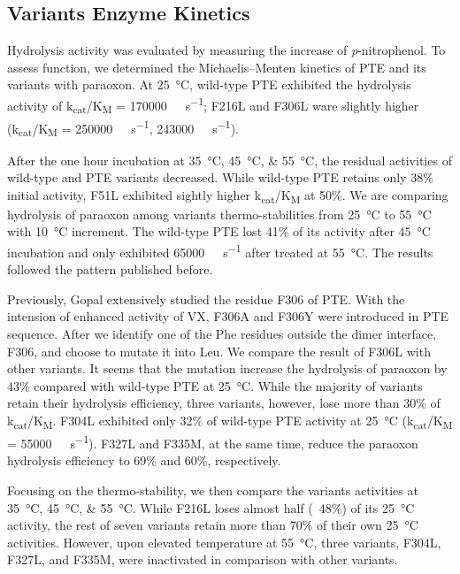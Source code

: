 \begin{refsection}
\subsection{Variants Enzyme Kinetics}

Hydrolysis activity was evaluated by measuring the increase of
\emph{p}-nitrophenol. To assess function, we determined the Michaelis–Menten
kinetics of PTE and its variants with paraoxon. At \SI{25}{\celsius},
wild-type PTE exhibited the hydrolysis activity of
k\textsubscript{cat}/K\textsubscript{M} = \SI{170000}{\per\Molar\per\second};
F216L and F306L ware slightly higher (k\textsubscript{cat}/K\textsubscript{M} =
\SI{250000}{\per\Molar\per\second}, \SI{243000}{\per\Molar\per\second}). 

After the one hour incubation at \SIlist{35;45;55}{\celsius}, the residual
activities of wild-type and PTE variants decreased. While wild-type PTE retains
only 38\% initial activity, F51L exhibited sightly higher
k\textsubscript{cat}/K\textsubscript{M} at 50\%. We are comparing hydrolysis of
paraoxon among variants thermo-stabilities from \SI{25}{\celsius} to
\SI{55}{\celsius} with \SI{10}{\celsius} increment. The wild-type PTE lost 41\%
of its activity after \SI{45}{\celsius} incubation and only exhibited
\SI{65000}{\per\Molar\per\second} after treated at \SI{55}{\celsius}. The
results followed the pattern published before.\cite{Yang2014a} 

Previously, Gopal  extensively studied the residue F306 of
PTE.\cite{Gopal2000} With the intension of enhanced activity of VX, F306A and
F306Y were introduced in PTE sequence. After we identify one of the Phe
residues outside the dimer interface, F306,  and choose to mutate it into Leu.
We compare the result of F306L with other variants. It seems that the mutation
increase the hydrolysis of paraoxon by 43\% compared with wild-type PTE at
\SI{25}{\celsius}. While the majority of variants retain their hydrolysis
efficiency, three variants, however, lose more than 30\% of
k\textsubscript{cat}/K\textsubscript{M}. F304L exhibited only 32\% of wild-type
PTE activity at \SI{25}{\celsius} (k\textsubscript{cat}/K\textsubscript{M} =
\SI{55000}{\per\Molar\per\second}). F327L and F335M, at the same time, reduce
the paraoxon hydrolysis efficiency to 69\% and 60\%, respectively.

Focusing on the thermo-stability, we then compare the variants activities at
\SIlist{35;45;55}{\celsius}. While F216L loses almost half (~48\%) of its
\SI{25}{\celsius} activity, the rest of seven variants retain more than 70\% of
their own \SI{25}{\celsius} activities. However, upon elevated temperature at
\SI{55}{\celsius}, three variants, F304L, F327L, and F335M, were inactivated in
comparison with other variants.


\end{refsection}
